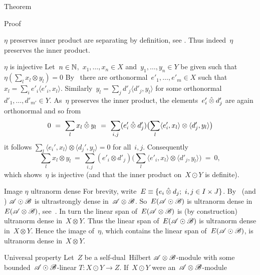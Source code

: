 \documentclass[b]{subfiles}
\begin{document}
\begin{parsec}
\begin{point}{Theorem}
\begin{point}{Proof}
\begin{point}{$\eta$ preserves inner product}
    are separating by definition, see .
Thus indeed~$\eta$ preserves the inner product.
\end{point}
\begin{point}{$\eta$ is injective}%
Let~$n \in \mathbb{N}$,~$x_1, \ldots, x_n \in X$
    and~$y_1,\ldots, y_n \in Y$
    be given such that~$\eta(\sum_l x_l \otimes y_l) = 0$
By~
    there are orthonormal~$e'_1,\ldots, e'_m \in X$
    such that~$x_l = \sum_i e'_i \langle e'_i, x_l\rangle$.
Similarly~$y_l = \sum_j d'_j \langle d'_j, y_l\rangle$
for some orthonormal~$d'_1, \ldots, d'_{m'} \in Y$.
As~$\eta$ preserves the inner product,
    the elements~$e_i'\mathbin{\hat{\otimes}} d_j'$ are again orthonormal
    and so from
\begin{equation*}
    0 \ =\  \sum_l x_l \mathbin{\hat{\otimes}} y_l
    \ =\  \sum_{i,j} (e'_i \mathbin{\hat{\otimes}} d'_j) \bigl(\sum_l
         \langle e'_i, x_l\rangle \otimes \langle d'_j, y_l\rangle\bigr)
\end{equation*}
         it follows
         $\sum_l \langle e_i',x_l\rangle \otimes \langle d_j',y_l\rangle = 0$
         for all~$i,j$.
Consequently
\begin{equation*}
    \sum_l x_l \otimes y_l
        \ =\  \sum_{i,j} (e'_i \otimes d'_j) \bigl(\sum_l
        \langle e'_i, x_l \rangle \otimes \langle d'_j, y_l \rangle 
        \bigr) \ = \ 0,
\end{equation*}
which shows~$\eta$ is injective
    (and that the inner product on~$X \odot Y$ is definite).
\end{point}
\begin{point}{Image $\eta$ ultranorm dense}%
For brevity, write~$E \equiv \{ e_i \mathbin{\hat{\otimes}} d_j; \ i,j \in I\times J\}$.
By~ (and )
    $\mathscr{A} \odot \mathscr{B}$ is ultrastrongly dense in~$\mathscr{A} \otimes \mathscr{B}$.
So~$E (\mathscr{A} \odot \mathscr{B})$
    is ultranorm dense in~$E (\mathscr{A} \otimes \mathscr{B})$,
    see~.
In turn the linear span of~$E (\mathscr{A} \otimes \mathscr{B})$
    is (by construction) ultranorm dense in~$X \otimes Y$.
Thus the linear span of~$E (\mathscr{A} \odot \mathscr{B})$
    is ultranorm dense in~$X \otimes Y$.
Hence the image of~$\eta$,
    which contains the linear span of~$E (\mathscr{A} \odot \mathscr{B})$,
    is ultranorm dense in~$X \otimes Y$.
\end{point}
\begin{point}{Universal property}%
Let~$Z$ be a self-dual~Hilbert $\mathscr{A} \otimes \mathscr{B}$-module
 with some bounded~$\mathscr{A} \odot \mathscr{B}$-linear $T\colon X \odot Y \to Z$.
If~$X \odot Y$ were an~$\mathscr{A} \otimes \mathscr{B}$-module

\end{point}
\end{point}
\end{point}
\end{parsec}
\end{document}

